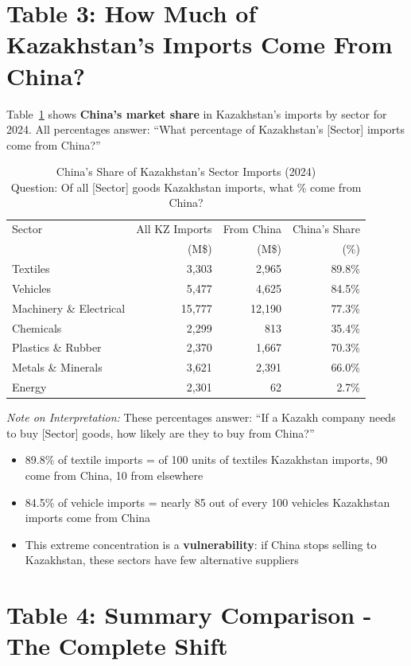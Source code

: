 \documentclass[12pt]{article}
\begin{document}
\section{Table 3: How Much of Kazakhstan's Imports Come From China?}

Table~\ref{tab:penetration} shows \textbf{China's market share} in Kazakhstan's imports by sector for 2024. All percentages answer: ``What percentage of Kazakhstan's [Sector] imports come from China?''

\begin{table}[H]
\centering
\small
\caption{China's Share of Kazakhstan's Sector Imports (2024) \\
Question: Of all [Sector] goods Kazakhstan imports, what \% come from China?}
\label{tab:penetration}
\begin{tabular}{lrrr}
\toprule
Sector & All KZ Imports & From China & China's Share \\
 & (M\$) & (M\$) & (\%) \\
\midrule
Textiles & 3,303 & 2,965 & 89.8\% \\
Vehicles & 5,477 & 4,625 & 84.5\% \\
Machinery \& Electrical & 15,777 & 12,190 & 77.3\% \\
Chemicals & 2,299 & 813 & 35.4\% \\
Plastics \& Rubber & 2,370 & 1,667 & 70.3\% \\
Metals \& Minerals & 3,621 & 2,391 & 66.0\% \\
Energy & 2,301 & 62 & 2.7\% \\
\bottomrule
\end{tabular}
\footnotesize
\emph{Note on Interpretation:} These percentages answer: ``If a Kazakh company needs to buy [Sector] goods, how likely are they to buy from China?'' 
\begin{itemize}
\item 89.8\% of textile imports = of 100 units of textiles Kazakhstan imports, 90 come from China, 10 from elsewhere
\item 84.5\% of vehicle imports = nearly 85 out of every 100 vehicles Kazakhstan imports come from China
\item This extreme concentration is a \textbf{vulnerability}: if China stops selling to Kazakhstan, these sectors have few alternative suppliers
\end{itemize}
\end{table}

\section{Table 4: Summary Comparison - The Complete Shift}
\end{document}
